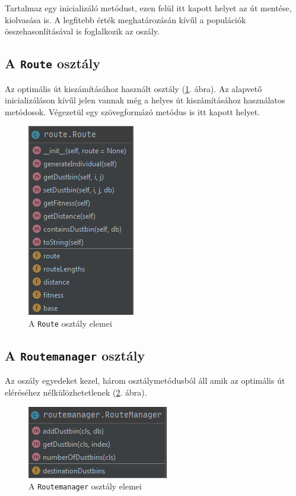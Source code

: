 Tartalmaz egy inicializáló metódust, ezen felül itt kapott helyet az út mentése, kiolvasása is. A legfitebb érték meghatározásán kívűl a populációk összehasonlításával is foglalkozik az oszály. 

\subsection{A \texttt{Route} osztály}

Az optimális út kiszámításához használt osztály (\ref{fig:route}. ábra). Az alapvető inicializáláson kívűl jelen vannak még a helyes út kiszámításához használatos metódosok. Végezetül egy szövegformázó metódus is itt kapott helyet.

\begin{figure}[!htb]
	\centering
	\includegraphics[scale=0.8]{images/route.png}
	\caption{A \texttt{Route} osztály elemei}
	\label{fig:route}
\end{figure}

\subsection{A \texttt{Routemanager} osztály}

Az oszály egyedeket kezel, három osztálymetódusból áll amik az optimális út eléréséhez nélkülözhetetlenek (\ref{fig:routeManager}. ábra).

\begin{figure}[!htb]
	\centering
	\includegraphics[scale=0.8]{images/routemanager.png}
	\caption{A \texttt{Routemanager} osztály elemei}
	\label{fig:routeManager}
\end{figure}

